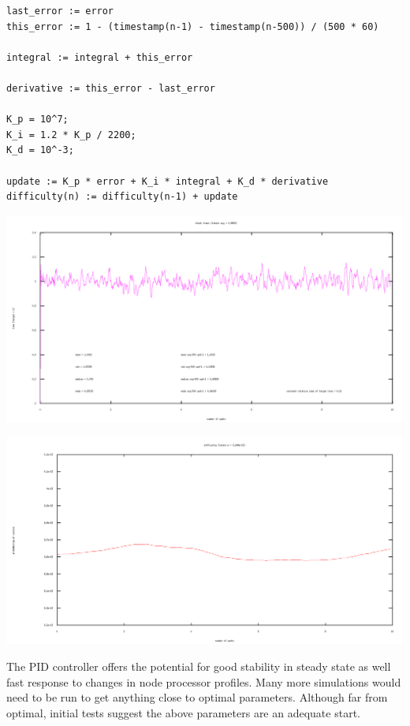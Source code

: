\documentclass[10pt,a4paper]{article}
\begin{document}
\begin{verbatim}
last_error := error
this_error := 1 - (timestamp(n-1) - timestamp(n-500)) / (500 * 60)

integral := integral + this_error

derivative := this_error - last_error

K_p = 10^7;
K_i = 1.2 * K_p / 2200;
K_d = 10^-3;

update := K_p * error + K_i * integral + K_d * derivative
difficulty(n) := difficulty(n-1) + update
\end{verbatim}

\includegraphics[width=14cm]{SimulationGraphs/simulation_avg-500_upd-1_PID.png}

\includegraphics[width=14cm]{SimulationGraphs/simulation_avg-500_upd-1_PID_diff.png}

The PID controller offers the potential for good stability in steady state as well fast response to changes in node processor profiles. Many more simulations would need to be run to get anything close to optimal parameters. Although far from optimal, initial tests suggest the above parameters are an adequate start.
\end{document}
